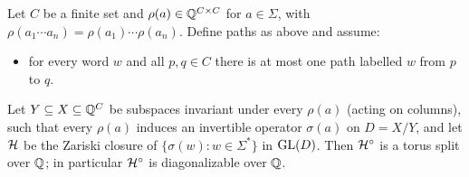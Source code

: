\begin{lemma}\label{lem:component}
Let $C$ be a finite set and $\rho(a)\in\mathbb{Q}^{C\times C}$ for $a\in\Sigma$, with
$\rho(a_1\cdots a_n)=\rho(a_1)\cdots\rho(a_n)$. Define paths as above and assume:
\begin{itemize}
\item[(U)] for every word $w$ and all $p,q\in C$ there is at most one path labelled $w$ from $p$ to $q$.
\end{itemize}
Let $Y\subseteq X\subseteq\mathbb{Q}^C$ be subspaces invariant under every $\rho(a)$ (acting on columns), such
that every $\rho(a)$ induces an invertible operator $\sigma(a)$ on $D=X/Y$, and let $\mathcal{H}$ be the
Zariski closure of $\{\sigma(w):w\in\Sigma^*\}$ in $\mathrm{GL}(D)$. Then $\mathcal{H}^\circ$ is a torus split over
$\mathbb{Q}$; in particular $\mathcal{H}^\circ$ is diagonalizable over $\mathbb{Q}$.
\end{lemma}
